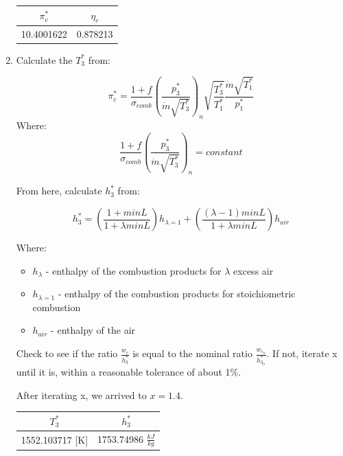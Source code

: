 \documentclass[titlepage]{article}
\begin{document}
\begin{enumerate}
  \begin{center}
    \begin{tabular}{|c|c|}
      \hline
      $\pi_{c}^{*}$ & $\eta_{c}$ \\
      \hline
      10.4001622 & 0.878213 \\
      \hline
    \end{tabular}
  \end{center}
  \item Calculate the $T_{3}^{*}$ from:
  
  \begin{equation}
    \pi_{c}^{*} = \frac{1+f}{\sigma_{comb}} \left( \frac{p_{3}^{*}}{\dot{m}\sqrt{T_{3}^{*}}} \right)_{n}
    \sqrt{\frac{T_{3}^{*}}{T_{1}^{*}}} \frac{\dot{m}\sqrt{T_{1}^{*}}}{p_{1}^{*}}
  \end{equation}
  Where:
  \begin{equation}
    \frac{1+f}{\sigma_{comb}} \left( \frac{p_{3}^{*}}{\dot{m}\sqrt{T_{3}^{*}}} \right)_{n} = constant
  \end{equation}
  
  From here, calculate $h_{3}^{*}$ from:

  \begin{equation}
    h_{3}^{*} = \left(\frac{1+minL}{1+\lambda minL}\right) h_{\lambda =1} + \left(\frac{(\lambda -1) minL}{1+\lambda minL}\right) h_{air}
  \end{equation}

  Where:
  \begin{itemize}
    \item $h_{\lambda}$ - enthalpy of the combustion products for $\lambda$ excess air
    \item $h_{\lambda = 1}$ - enthalpy of the combustion products for stoichiometric combustion
    \item $h_{air}$ - enthalpy of the air
  \end{itemize}

  Check to see if the ratio $\frac{w_{c}}{h_{3}^{*}}$ is equal to the nominal ratio
  $\frac{w_{c_{n}}}{h_{3_{n}}^{*}}$. If not, iterate x until it is, within a reasonable tolerance of about 1\%.

  \vspace{0.5cm}

  After iterating x, we arrived to $x = 1.4$.

  \begin{center}
    \begin{tabular}{|c|c|}
      \hline
      $T_{3}^{*}$ & $h_{3}^{*}$ \\
      \hline
      1552.103717 [K] & 1753.74986 $\frac{kJ}{kg}$ \\
      \hline
    \end{tabular}
  \end{center}


\end{enumerate}
\end{document}
